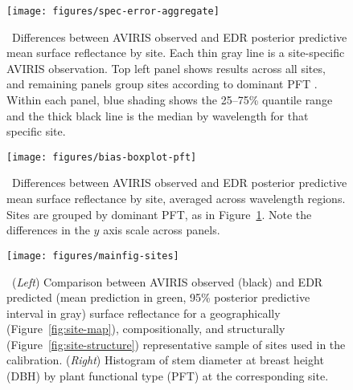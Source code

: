 \begin{figure}
  \centering
  \texttt{[image: figures/spec-error-aggregate]}
  \caption{\label{fig:spec-error-aggregate}\
    Differences between AVIRIS observed and EDR posterior predictive mean surface reflectance by site.
    Each thin gray line is a site-specific AVIRIS observation.
    Top left panel shows results across all sites,
    and remaining panels group sites according to dominant PFT .
    Within each panel, blue shading shows the 25--75\% quantile range and the thick black line is the median by wavelength for that specific site.
  }
\end{figure}

\begin{figure}
  \centering
  \texttt{[image: figures/bias-boxplot-pft]}
  \caption{\label{fig:bias-boxplot-pft}\
    Differences between AVIRIS observed and EDR posterior predictive mean surface reflectance by site, averaged across wavelength regions.
    Sites are grouped by dominant PFT, as in Figure~\ref{fig:spec-error-aggregate}.
    Note the differences in the $y$ axis scale across panels.
  }
\end{figure}

\begin{figure}
  \centering
  \texttt{[image: figures/mainfig-sites]}
  \caption{\label{fig:spec-error-all}\
    (\emph{Left}) Comparison between AVIRIS observed (black) and
    EDR predicted (mean prediction in green, 95\% posterior predictive interval in gray)
    surface reflectance for a geographically (Figure~\ref{fig:site-map}), compositionally, and structurally (Figure~\ref{fig:site-structure}) representative sample of sites used in the calibration.
    (\emph{Right}) Histogram of stem diameter at breast height (DBH) by plant functional type (PFT) at the corresponding site.
  }
\end{figure}

